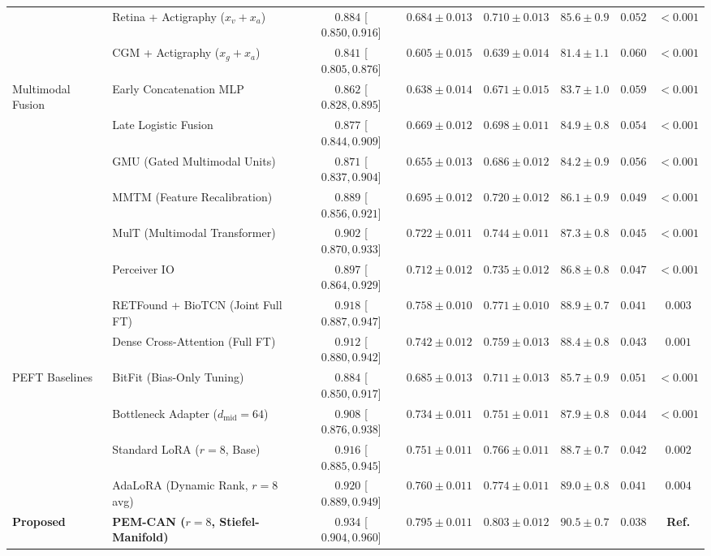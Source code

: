 \documentclass[journal,10pt,twocolumn]{IEEEtran}
\begin{document}
\begin{table}[!t]
{\begin{tabular}{llcccccc}
& Retina + Actigraphy ($x_v + x_a$) & $0.884$ [$0.850, 0.916$] & $0.684 \pm 0.013$ & $0.710 \pm 0.013$ & $85.6 \pm 0.9$ & $0.052$ & $<0.001$ \\
& CGM + Actigraphy ($x_g + x_a$) & $0.841$ [$0.805, 0.876$] & $0.605 \pm 0.015$ & $0.639 \pm 0.014$ & $81.4 \pm 1.1$ & $0.060$ & $<0.001$ \\
\midrule
\multirow{7}{*}{Multimodal Fusion} 
& Early Concatenation MLP & $0.862$ [$0.828, 0.895$] & $0.638 \pm 0.014$ & $0.671 \pm 0.015$ & $83.7 \pm 1.0$ & $0.059$ & $<0.001$ \\
& Late Logistic Fusion & $0.877$ [$0.844, 0.909$] & $0.669 \pm 0.012$ & $0.698 \pm 0.011$ & $84.9 \pm 0.8$ & $0.054$ & $<0.001$ \\
& GMU (Gated Multimodal Units)~\cite{arevalo2017gmu} & $0.871$ [$0.837, 0.904$] & $0.655 \pm 0.013$ & $0.686 \pm 0.012$ & $84.2 \pm 0.9$ & $0.056$ & $<0.001$ \\
& MMTM (Feature Recalibration)~\cite{joze2020mmtm} & $0.889$ [$0.856, 0.921$] & $0.695 \pm 0.012$ & $0.720 \pm 0.012$ & $86.1 \pm 0.9$ & $0.049$ & $<0.001$ \\
& MulT (Multimodal Transformer)~\cite{tsai2019mult} & $0.902$ [$0.870, 0.933$] & $0.722 \pm 0.011$ & $0.744 \pm 0.011$ & $87.3 \pm 0.8$ & $0.045$ & $<0.001$ \\
& Perceiver IO~\cite{jaegle2021perceiver} & $0.897$ [$0.864, 0.929$] & $0.712 \pm 0.012$ & $0.735 \pm 0.012$ & $86.8 \pm 0.8$ & $0.047$ & $<0.001$ \\
& RETFound + BioTCN (Joint Full FT)~\cite{zhou2023retfound} & $0.918$ [$0.887, 0.947$] & $0.758 \pm 0.010$ & $0.771 \pm 0.010$ & $88.9 \pm 0.7$ & $0.041$ & $0.003$ \\
& Dense Cross-Attention (Full FT) & $0.912$ [$0.880, 0.942$] & $0.742 \pm 0.012$ & $0.759 \pm 0.013$ & $88.4 \pm 0.8$ & $0.043$ & $0.001$ \\
\midrule
\multirow{4}{*}{PEFT Baselines} 
& BitFit (Bias-Only Tuning)~\cite{zaken2022bitfit} & $0.884$ [$0.850, 0.917$] & $0.685 \pm 0.013$ & $0.711 \pm 0.013$ & $85.7 \pm 0.9$ & $0.051$ & $<0.001$ \\
& Bottleneck Adapter ($d_{\text{mid}}=64$)~\cite{houlsby2019parameter} & $0.908$ [$0.876, 0.938$] & $0.734 \pm 0.011$ & $0.751 \pm 0.011$ & $87.9 \pm 0.8$ & $0.044$ & $<0.001$ \\
& Standard LoRA ($r=8$, Base)~\cite{hu2022lora} & $0.916$ [$0.885, 0.945$] & $0.751 \pm 0.011$ & $0.766 \pm 0.011$ & $88.7 \pm 0.7$ & $0.042$ & $0.002$ \\
& AdaLoRA (Dynamic Rank, $r=8$ avg)~\cite{zhang2023adalora} & $0.920$ [$0.889, 0.949$] & $0.760 \pm 0.011$ & $0.774 \pm 0.011$ & $89.0 \pm 0.8$ & $0.041$ & $0.004$ \\
\midrule
\rowcolor{green!10}
\textbf{Proposed} & \textbf{PEM-CAN ($r=8$, Stiefel-Manifold)} & $\mathbf{0.934}$ [$\mathbf{0.904, 0.960}$] & $\mathbf{0.795 \pm 0.011}$ & $\mathbf{0.803 \pm 0.012}$ & $\mathbf{90.5 \pm 0.7}$ & $\mathbf{0.038}$ & \textbf{Ref.} \\
\bottomrule
\end{tabular}
}
\end{table}
\end{document}
